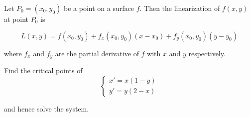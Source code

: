 \begin{theorem}
    Let $P_0 = (x_0, y_0)$ be a point on a surface $f$. Then the linearization of $f(x, y)$ 
    at point $P_0$ is 
    
    \begin{equation}
        L(x,y) = f(x_0, y_0) + f_x(x_0, y_0)(x - x_0) + f_y(x_0, y_0)(y - y_0) 
    \end{equation}

    where $f_x$ and $f_y$ are the partial derivative of $f$ with $x$ and $y$ respectively.
\end{theorem}

\begin{example}
    Find the critical points of 
    \begin{equation*}
        \begin{cases}
            x' = x(1-y)\\
            y' = y(2-x)
        \end{cases}
    \end{equation*}

    and hence solve the system.
\end{example}
